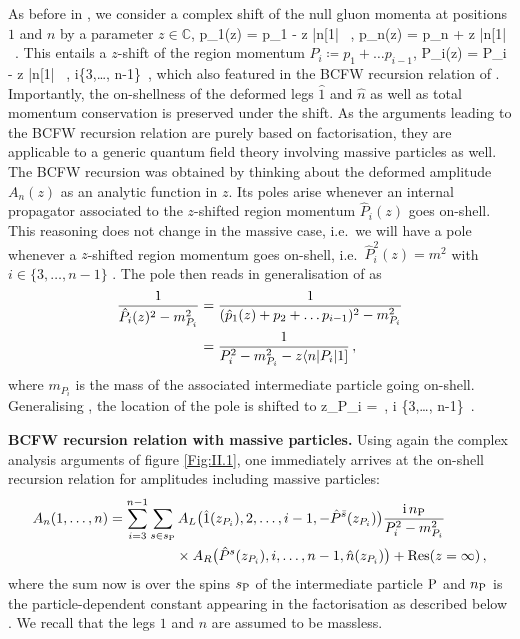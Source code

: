 As before in , we consider a complex shift  of the null gluon  momenta 
at positions $1$ and $n$  by a parameter $z\in \mathbb{C}$,
%
\be
{\hat p}_{1}(z)   = p_{1} - z |n\rangle [1| \, , \qquad
{\hat p}_{n}(z)   = p_{n} + z |n\rangle [1| \, .
\ee
%
This entails a $z$-shift of the region momentum $P_{i} \coloneqq p_{1}+\ldots p_{i-1}$,
\be
{\hat P}_{i}(z)  = P_{i} - z |n\rangle [1| \, ,  \qquad i\in \{3,\ldots , n-1\}\, ,
\ee
which also featured in the BCFW recursion
relation of . 
Importantly, the on-shellness of the deformed legs $\hat 1$ and $\hat n$ as well as total momentum conservation is preserved under the shift.
As the arguments leading to the BCFW recursion 
relation are purely based on factorisation, they are applicable to a generic quantum field theory involving massive particles as well.
The BCFW recursion was obtained by thinking about the deformed amplitude 
$A_{n}(z)$ as an analytic function in $z$. Its poles arise whenever an internal propagator
associated to the $z$-shifted region momentum ${\hat P}_{i}(z)$ goes on-shell. 
This reasoning does not change in the massive case, i.e.~we will have a pole whenever 
a $z$-shifted region momentum goes on-shell, i.e.~$\hat P^{2}_{i}(z)=m^{2}$ with $i\in\{3,\ldots , n-1\}$ . 
The pole then reads in generalisation of  as
%
\begin{align}
\label{massivepoleargumentbcfw}
\frac{1}{\hat{P}_{i}(z)^{2}-m_{P_{i}}^{2}} & = \frac{1}{(\hat{p}_{1}(z) + p_{2} + \ldots p_{i-1})^2
-m_{P_{i}}^{2}} \nn \\ 
%
& = \frac{1}{P_{i}^2 -m_{P_{i}}^{2} - z \langle n | P_{i} | 1 \rbrack}\,, 
\end{align}
%
where $m_{P_{i}}$ is the mass of the associated intermediate particle going on-shell. 
Generalising , the location of the pole is shifted to
%
\be
\label{mzpole}
z_{P_{i}} =\, , \qquad
\forall i \in \{3,\ldots , n-1\}\, . 
\ee
%
\begin{svgraybox}{\bf BCFW recursion relation with massive particles.}
Using again the complex analysis arguments of figure \ref{Fig:II.1}, one immediately arrives
at the on-shell recursion relation for amplitudes including massive particles:
%
\begin{align}
%
\begin{split}\label{massiveBCFWrec}
A_{n}(1,\ldots, n)  
= \sum_{i=3}^{n-1} \sum_{s \in s_{\rm P}}  &\, 
%
A_{L}\bigl(\hat 1(z_{P_{i}}),2,\ldots,i-1,-{\hat P}^{\bar{s}}(z_{P_{i}}) \bigr) 
\frac{\i \, n_{\rm P}}{P_{i}^2-m_{P_{i}}^{2}} \\ 
& \times A_{R}\bigl({\hat P}^{s}(z_{P_{i}}),i,\ldots, n-1, \hat n(z_{P_{i}})\bigr)
+ {\rm Res}(z=\infty)\,,
\end{split}
\end{align}
%
where the sum now is over the spins $s_{\rm P}$ of the intermediate particle $\rm P$ and $n_{\rm P}$ is the particle-dependent constant appearing in the factorisation as described below . We recall
that the legs $1$ and $n$ are assumed to be massless. 
\end{svgraybox}

